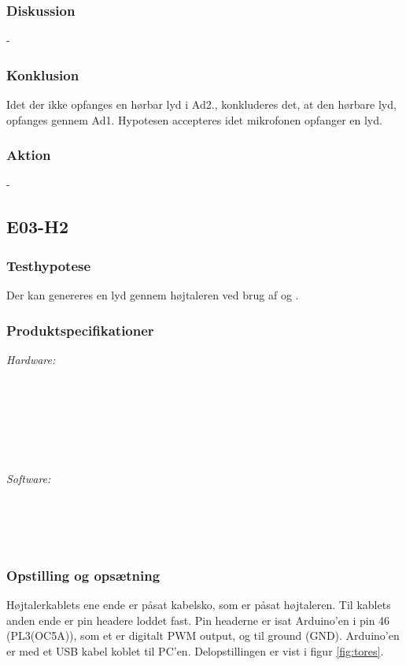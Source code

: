 		\subsubsection{Diskussion} 
		- 
		
		\subsubsection{Konklusion}
		Idet der ikke opfanges en hørbar lyd i Ad2., konkluderes det, at den hørbare lyd, opfanges gennem Ad1. 
		Hypotesen accepteres idet mikrofonen opfanger en lyd. 
		\subsubsection{Aktion}
		- 
	
	\subsection{E03-H2}
	\label{subsec:E03}
		\subsubsection{Testhypotese}
		Der kan genereres en lyd gennem højtaleren ved brug af \arduino{} og \labview.
		\subsubsection{Produktspecifikationer}
	
	
		\textit{Hardware:}\\
		\tores\\
		\hojtalerkabel\\
		\kabelsko\\
		\pins\\
		\arduino\\
		\PC\\
		\usbkabel
	
		\textit{Software:}\\
		\labview\\
		\visa\\
		\vi\\
		\ardsw\
	
		\subsubsection{Opstilling og opsætning}
		Højtalerkablets ene ende er påsat kabelsko, som er påsat højtaleren. Til kablets anden ende er pin headere loddet fast. Pin headerne er isat Arduino'en i pin 46 (PL3(OC5A)), som et er digitalt PWM output, og til ground (GND). 
		Arduino'en er med et USB kabel koblet til PC'en. Delopstillingen er vist i figur \ref{fig:tores}.\\ 
	  

